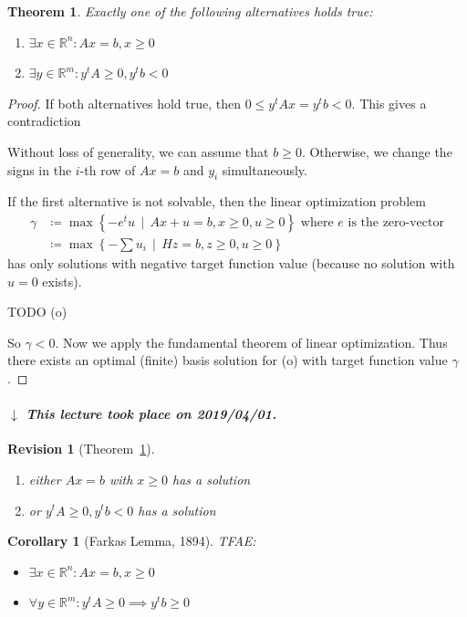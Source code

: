 \documentclass[a4paper]{article}
\newcounter{lecref}[section]
\numberwithin{lecref}{section}
\newtheorem{theorem}[lecref]{Theorem}
\newtheorem{corollary}[lecref]{Corollary}
\newtheorem{revision}{Revision}
\newcommand{\SetDef}[2]{\left\{#1\,\mid\,#2\right\}}
\newcommand{\dateref}[1]{%
  \begin{mdframed}[backgroundcolor=gray!10,innerbottommargin=0pt,innertopmargin=0pt]
    \paragraph{\textit{$\downarrow$ This lecture took place on #1.}}%
  \end{mdframed}%
}
\begin{document}
\begin{theorem}
	\label{theorem:4.3}
	Exactly one of the following alternatives holds true:
	\begin{enumerate}
		\item $\exists x \in \mathbb R^n: Ax = b, x \geq 0$
		\item $\exists y \in \mathbb R^m: y^t A \geq 0, y^t b < 0$
	\end{enumerate}
\end{theorem}

\begin{proof}
	If both alternatives hold true, then $0 \leq y^tAx = y^tb < 0$. This gives a contradiction

	Without loss of generality, we can assume that $b \geq 0$. Otherwise, we change the signs in the $i$-th row of $Ax = b$ and $y_i$ simultaneously.

	If the first alternative is not solvable, then the linear optimization problem 
	\begin{align*}
		\gamma &\coloneqq \max\SetDef{-e^tu}{Ax + u = b, x \geq 0, u \geq 0} \text{ where $e$ is the zero-vector} \\
			   &\coloneqq \max\SetDef{-\sum u_i}{Hz = b, z \geq 0, u \geq 0}
	\end{align*}
	has only solutions with negative target function value (because no solution with $u = 0$ exists).

	TODO (o)

	So $\gamma < 0$. Now we apply the fundamental theorem of linear optimization.
	Thus there exists an optimal (finite) basis solution for (o) with target function value $\gamma$.
\end{proof}

\dateref{2019/04/01}

\begin{revision}[Theorem~\ref{theorem:4.3}]
	\begin{enumerate}
		\item either $Ax = b$ with $x \geq 0$ has a solution
		\item or $y^t A \geq 0, y^tb <0$ has a solution
	\end{enumerate}
\end{revision}

\begin{corollary}[Farkas Lemma, 1894]
	\label{corollary:4.4}
	TFAE:
	\begin{itemize}
		\item $\exists x \in \mathbb R^n: Ax = b, x \geq 0$
		\item $\forall y \in \mathbb R^m: y^t A \geq 0 \implies y^t b \geq 0$
	\end{itemize}
\end{corollary}
\end{document}
